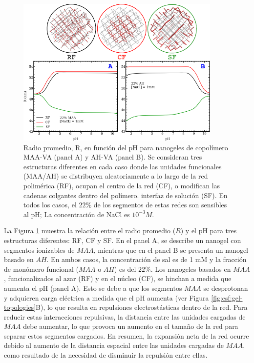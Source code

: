\begin{figure}[!htb]
     \centering
     \includegraphics[width=0.9\textwidth]{Figures/graphs-gel2/rr-nano-pH.pdf}
     \caption{Radio promedio, R, en funci\'on del pH para nanogeles de copol\'imero MAA-VA (panel A) y AH-VA (panel B).
     	Se consideran tres estructuras diferentes en cada caso donde las unidades funcionales (MAA/AH) se distribuyen aleatoriamente a lo largo de la red polim\'erica (RF), ocupan el centro de la red (CF), o modifican las cadenas colgantes dentro del pol\'imero. interfaz de soluci\'on (SF).
     	En todos los casos, el $22\%$ de los segmentos de estas redes son sensibles al pH; La concentraci\'on de NaCl es $10^{-3}M$.}
     \label{fig:esf:gel-charge-MAA-AH}
\end{figure}


La Figura \ref{fig:esf:gel-charge-MAA-AH} muestra la relaci\'on entre el radio promedio ($R$) y el pH para tres estructuras diferentes: RF, CF y SF. En el panel A, se describe un nanogel con segmentos ionizables de $MAA$, mientras que en el panel B se presenta un nanogel basado en $AH$. En ambos casos, la concentraci\'on de sal es de 1 mM y la fracci\'on de mon\'omero funcional ($MAA$ o $AH$) es del $22\%$. Los nanogeles basados en $MAA$, funcionalizados al azar (RF) y en el n\'ucleo (CF), se hinchan a medida que aumenta el pH (panel A). Esto se debe a que los segmentos $MAA$ se desprotonan y adquieren carga el\'ectrica a medida que el pH aumenta (ver Figura \ref{fig:esf:gel-topologies}B), lo que resulta en repulsiones electrost\'asticas dentro de la red. Para reducir estas interacciones repulsivas, la distancia entre las unidades cargadas de $MAA$ debe aumentar, lo que provoca un aumento en el tama\~no de la red para separar estos segmentos cargados. En resumen, la expansi\'on neta de la red ocurre debido al aumento de la distancia espacial entre las unidades cargadas de $MAA$, como resultado de la necesidad de disminuir la repulsi\'on entre ellas.



